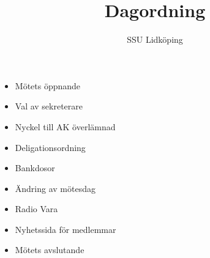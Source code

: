 \documentclass{article}
\begin{document}
\title{Dagordning}
\author{SSU Lidköping}
\maketitle
\begin{itemize}
\item Mötets öppnande
\item Val av sekreterare
\item Nyckel till AK överlämnad
\item Deligationsordning
\item Bankdosor
\item Ändring av mötesdag
\item Radio Vara
\item Nyhetssida för medlemmar
\item Mötets avslutande

\end{itemize}
\end{document}
